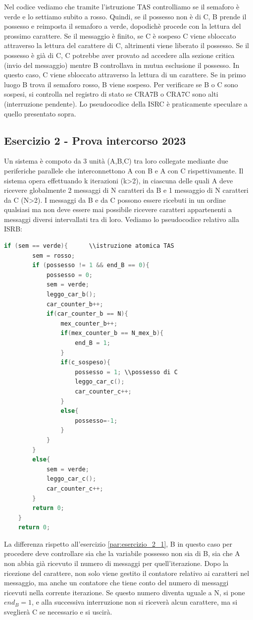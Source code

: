 Nel codice vediamo che tramite l'istruzione TAS controlliamo se il semaforo è verde e lo settiamo subito a rosso. Quindi, se il possesso non è di C, B prende il possesso e reimposta il semaforo a verde, dopodichè procede con la lettura del prossimo carattere. Se il messaggio è finito, se C è sospeso C viene sbloccato attraverso la lettura del carattere di C, altrimenti viene liberato il possesso. Se il possesso è già di C, C potrebbe aver provato ad accedere alla sezione critica (invio del messaggio) mentre B controllava in mutua esclusione il possesso. In questo caso, C viene sbloccato attraverso la lettura di un carattere. Se in primo luogo B trova il semaforo rosso, B viene sospeso.
Per verificare se B o C sono sospesi, si controlla nel registro di stato se CRA7B o CRA7C sono alti (interruzione pendente). 
Lo pseudocodice della ISRC è praticamente speculare a quello presentato sopra. 


\subsection{Esercizio 2 - Prova intercorso 2023}
Un sistema è compoto da 3 unità (A,B,C) tra loro collegate mediante due periferiche parallele che interconnettono A con B e A con C rispettivamente. Il sistema opera effettuando k iterazioni (k>2), in ciascuna delle quali A deve ricevere globalmente 2 messaggi di N caratteri da B e 1 messaggio di N caratteri da C (N>2). I messaggi da B e da C possono essere ricebuti in un ordine qualsiasi ma non deve essere mai possibile ricevere caratteri appartenenti a messaggi diversi intervallati tra di loro.
Vediamo lo pseudocodice relativo alla ISRB:

\begin{lstlisting}[language=C]
    if (sem == verde){      \\istruzione atomica TAS
        sem = rosso;
        if (possesso != 1 && end_B == 0){ 
            possesso = 0;
            sem = verde;
            leggo_car_b();
            car_counter_b++;
            if(car_counter_b == N){
                mex_counter_b++;
                if(mex_counter_b == N_mex_b){
                    end_B = 1;
                }
                if(c_sospeso){
                    possesso = 1; \\possesso di C
                    leggo_car_c();
                    car_counter_c++;
                }
                else{
                    possesso=-1;
                }
            }
        }
        else{
            sem = verde;
            leggo_car_c();
            car_counter_c++;
        }
        return 0;
    }
    return 0;
\end{lstlisting}

La differenza rispetto all'esercizio \ref{par:esercizio_2_1}, B in questo caso per procedere deve controllare sia che la variabile possesso non sia di B, sia che A non abbia già ricevuto il numero di messaggi per quell'iterazione. Dopo la ricezione del carattere, non solo viene gestito il contatore relativo ai caratteri nel messaggio, ma anche un contatore che tiene conto del numero di messaggi ricevuti nella corrente iterazione. Se questo numero diventa uguale a N, si pone $end_B = 1$, e alla successiva interruzione non si riceverà alcun carattere, ma si sveglierà C se necessario e si uscirà. 
